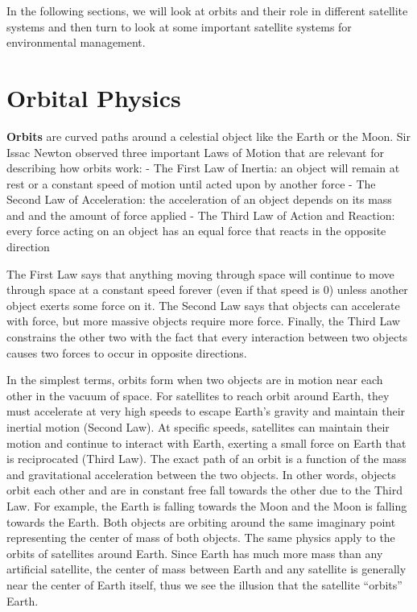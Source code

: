 \documentclass[
]{book}
\begin{document}
In the following sections, we will look at orbits and their role in different satellite systems and then turn to look at some important satellite systems for environmental management.

\section{Orbital Physics}\label{orbital-physics}

\textbf{Orbits} are curved paths around a celestial object like the Earth or the Moon. Sir Issac Newton observed three important Laws of Motion that are relevant for describing how orbits work:
- The First Law of Inertia: an object will remain at rest or a constant speed of motion until acted upon by another force
- The Second Law of Acceleration: the acceleration of an object depends on its mass and and the amount of force applied
- The Third Law of Action and Reaction: every force acting on an object has an equal force that reacts in the opposite direction

The First Law says that anything moving through space will continue to move through space at a constant speed forever (even if that speed is 0) unless another object exerts some force on it. The Second Law says that objects can accelerate with force, but more massive objects require more force. Finally, the Third Law constrains the other two with the fact that every interaction between two objects causes two forces to occur in opposite directions.

In the simplest terms, orbits form when two objects are in motion near each other in the vacuum of space. For satellites to reach orbit around Earth, they must accelerate at very high speeds to escape Earth's gravity and maintain their inertial motion (Second Law). At specific speeds, satellites can maintain their motion and continue to interact with Earth, exerting a small force on Earth that is reciprocated (Third Law). The exact path of an orbit is a function of the mass and gravitational acceleration between the two objects. In other words, objects orbit each other and are in constant free fall towards the other due to the Third Law. For example, the Earth is falling towards the Moon and the Moon is falling towards the Earth. Both objects are orbiting around the same imaginary point representing the center of mass of both objects. The same physics apply to the orbits of satellites around Earth. Since Earth has much more mass than any artificial satellite, the center of mass between Earth and any satellite is generally near the center of Earth itself, thus we see the illusion that the satellite ``orbits'' Earth.
\end{document}
